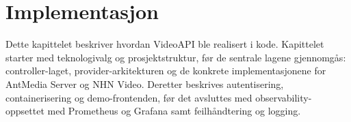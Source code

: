 \chapter{Implementasjon}
\label{ch:implementasjon}

Dette kapittelet beskriver hvordan VideoAPI ble realisert i kode. Kapittelet starter med teknologivalg og prosjektstruktur, før de sentrale lagene gjennomgås: controller-laget, provider-arkitekturen og de konkrete implementasjonene for AntMedia Server og NHN Video. Deretter beskrives autentisering, containerisering og demo-frontenden, før det avsluttes med observability-oppsettet med Prometheus og Grafana samt feilhåndtering og logging.













